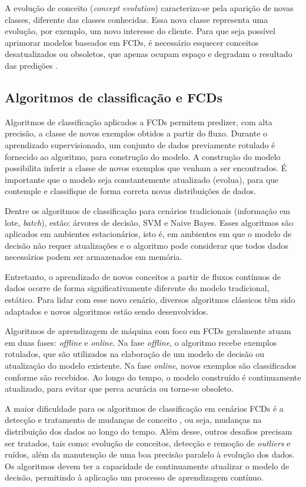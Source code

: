\documentclass[qual, classic, a4paper]{ufbathesis}
\begin{document}
A evolução de conceito (\textit{concept evolution}) caracteriza-se pela aparição de novas classes, diferente das classes conhecidas. Essa nova classe representa uma evolução, por exemplo, um novo interesse do cliente. Para que seja possível aprimorar modelos baseados em FCDs, é necessário esquecer conceitos desatualizados ou obsoletos, que apenas ocupam espaço e degradam o resultado das predições \cite{Abdallah}.

\subsection{Algoritmos de classificação e FCDs}

Algoritmos de classificação aplicados a FCDs permitem predizer, com alta precisão, a classe de novos exemplos obtidos a partir do fluxo. 
Durante o aprendizado supervisionado, um conjunto de dados previamente rotulado é fornecido ao algoritmo, para construção do modelo. A construção do modelo possibilita inferir a classe de novos exemplos que venham a ser encontrados. É importante que o modelo seja constantemente atualizado (evolua), para que contemple e classifique de forma correta novas distribuições de dados.

Dentre os algoritmos de classificação para cenários tradicionais (informação em lote, \textit{batch}), estão: árvores de decisão, SVM e Naive Bayes. Esses algoritmos são aplicados em ambientes estacionários, isto é, em ambientes em que o modelo de decisão não requer atualizações e o algoritmo pode considerar que todos dados necessários podem ser armazenados em memória.

Entretanto, o aprendizado de novos conceitos a partir de fluxos contínuos de dados ocorre de forma significativamente diferente do modelo tradicional, estático. Para lidar com esse novo cenário, diversos algoritmos clássicos têm sido adaptados e novos algoritmos estão sendo desenvolvidos.

Algoritmos de aprendizagem de máquina com foco em FCDs geralmente atuam em duas fases: \textit{offline} e \textit{online}. Na fase \textit{offline}, o algoritmo recebe exemplos rotulados, que são utilizados na elaboração de um modelo de decisão ou atualização do modelo existente. Na fase \textit{online}, novos exemplos são classificados conforme são recebidos. Ao longo do tempo, o modelo construído é continuamente atualizado, para evitar que perca acurácia ou torne-se obsoleto.

A maior dificuldade para os algoritmos de classificação em cenários FCDs é a detecção e tratamento de mudanças de conceito \cite{Aggarwal:2006:DSM:1196418}, ou seja, mudanças na distribuição dos dados ao longo do tempo. 
Além desse, outros desafios precisam ser tratados, tais como: evolução de conceitos, detecção e remoção de \textit{outliers} e ruídos, além da manutenção de uma boa precisão paralelo à evolução dos dados. Os algoritmos devem ter a capacidade de continuamente atualizar o modelo de decisão, permitindo à aplicação um processo de aprendizagem contínuo.
\end{document}
